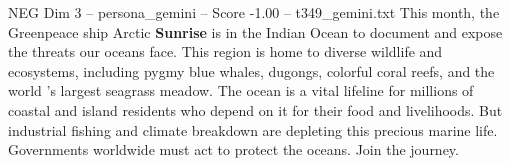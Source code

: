 \begin{textsample}{NEG Dim 3 – persona\_gemini – Score -1.00 – t349\_gemini.txt}  \label{ex:f3_neg_011}
This month, the Greenpeace ship Arctic \textbf{Sunrise} is in the Indian Ocean to document and expose the threats our oceans face.
This region is home to diverse wildlife and ecosystems, including pygmy blue whales, dugongs, colorful coral reefs, and the world 's largest seagrass meadow.
The ocean is a vital lifeline for millions of coastal and island residents who depend on it for their food and livelihoods.
But industrial fishing and climate breakdown are depleting this precious marine life.
Governments worldwide must act to protect the oceans.
Join the journey.

\end{textsample}
